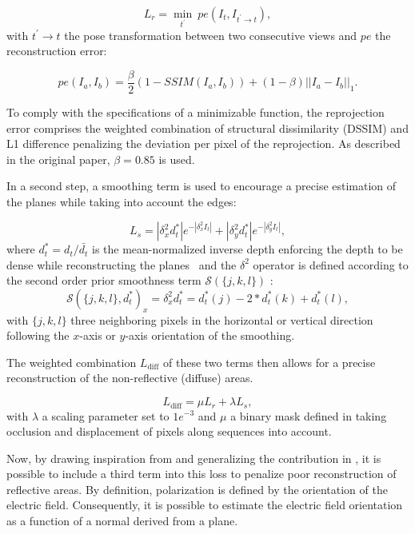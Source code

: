 \begin{equation}
L_r = \min_{t^\prime} \: pe(I_t, I_{t^\prime \rightarrow t}),
\end{equation}
with $t^\prime \rightarrow t$ the pose transformation between two consecutive views and $pe$ the reconstruction error:

\begin{equation}
pe(I_a, I_b) = \frac{\beta}{2} (1- SSIM(I_a, I_b)) + (1-\beta) ||I_a - I_b||_1.
\end{equation}


To comply with the specifications of a minimizable function, the reprojection error comprises the weighted combination of structural dissimilarity (DSSIM) and L1 difference penalizing the deviation per pixel of the reprojection. As described in the original paper, $\beta = 0.85$ is used.


In a second step, a smoothing term is used to encourage a precise estimation of the planes while taking into account the edges:

\begin{equation}
L_s = |\delta^2_xd_t^*| e^{-|\delta^2_x I_t|} + |\delta^2_yd_t^*| e^{-|\delta^2_y I_t|},
\end{equation}
where $d_t^* = d_t / \bar{d_t}$ is the mean-normalized inverse depth enforcing the depth to be dense while reconstructing the planes~\cite{wang2018learning} and the $\delta^2$ operator is defined according to the second order prior smoothness term $\mathcal{S}(\{j,k,l\})$ \cite{Woodford2008GlobalPriors}:
\begin{equation}
\mathcal{S}(\{j,k,l\},d_t^*)_x = \delta^2_x d_t^* = d_t^*(j) - 2* d_t^*(k) + d_t^*(l),
\end{equation}
with $\{j, k, l\}$ three neighboring pixels in the horizontal or vertical direction following the $x$-axis or $y$-axis orientation of the smoothing.

The weighted combination $L_{\textrm{diff}}$ of these two terms then allows for a precise reconstruction of the non-reflective (diffuse) areas.


\begin{equation}
L_{\textrm{diff}} = \mu L_r + \lambda L_s,
\end{equation}
with $\lambda$ a scaling parameter set to $1e^{-3}$ and $\mu$ a binary mask defined in \cite{godard2019digging} taking occlusion and displacement of pixels along sequences into account.

Now, by drawing inspiration from and generalizing the contribution in \cite{berger2017depth}, it is possible to include a third term into this loss to penalize poor reconstruction of reflective areas. By definition, polarization is defined by the orientation of the electric field. Consequently, it is possible to estimate the electric field orientation as a function of a normal derived from a plane.

